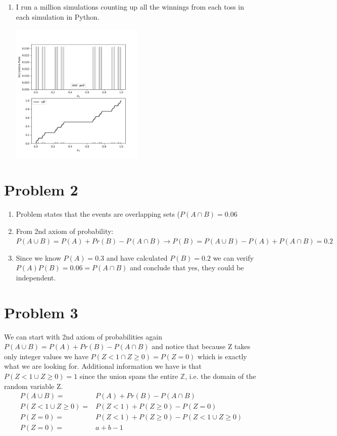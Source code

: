\documentclass{article}
\newcommand{\1}{\mathbf{1}}
\newcommand{\Z}{\mathbb{Z}}
\begin{document}
\begin{enumerate}
	\newpage
	\item I run a million simulations counting up all the winnings from each toss in each simulation in Python.
	\begin{center}
    \includegraphics[width=2.5in]{STATS509/HW2/HW2Figures/problem1c.png}
    \end{center}
    
\end{enumerate}


\newpage
\section*{Problem 2}
\begin{enumerate}
	\item Problem states that the events are overlapping sets ($P(A\cap B) =0.06$
	\item From 2nd axiom of probability: $P(A\cup B) = P(A) + Pr(B) - P(A\cap B) \rightarrow P(B) = P(A\cup B)  - P(A) + P(A\cap B) = 0.2$
	\item Since we know $P(A)=0.3$ and have calculated $P(B)=0.2$ we can verify $P(A)P(B)=0.06=P(A\cap B)$ and conclude that yes, they could be independent.
\end{enumerate}


\section*{Problem 3}
We can start with 2nd axiom of probabilities again $P(A\cup B) = P(A) + Pr(B) - P(A\cap B)$ and notice that because Z takes only integer values we have $P(Z<1 \cap Z\geq 0) = P(Z=0)$ which is exactly what we are looking for. Additional information we have is that $P(Z<1 \cup Z\geq 0) = 1$ since the union spans the entire $\Z$, i.e. the domain of the random variable Z.
\begin{align*}
P(A\cup B) =& P(A) + Pr(B) - P(A\cap B) \\
P(Z<1 \cup Z\geq 0) =& P(Z<1) + P(Z\geq 0) - P(Z=0) \\
P(Z=0) =& P(Z<1) + P(Z\geq 0) - P(Z<1 \cup Z\geq 0) \\
P(Z=0) =& a + b - 1
\end{align*}
\end{document}
